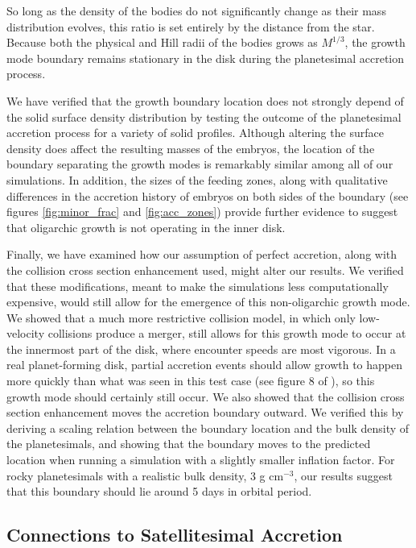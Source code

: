 So long as the density of the bodies do not significantly change as
their mass distribution evolves, this ratio is set entirely by the distance
from the star. Because both the physical and Hill radii of the bodies
grows as $M^{1/3}$, the growth mode boundary remains stationary
 in the disk during the planetesimal accretion process.
 
We have verified that the growth boundary location does not strongly depend of the
solid surface density distribution by testing the outcome of the planetesimal
accretion process for a variety of solid
profiles. Although altering the surface density does affect the
resulting masses of the embryos, the location of the boundary
separating the growth modes is remarkably similar among all of our simulations.
In addition, the sizes of the feeding zones, along with qualitative differences in the
accretion history of embryos on both sides of the boundary (see figures \ref{fig:minor_frac} and \ref{fig:acc_zones}) provide further evidence to
suggest that oligarchic growth is not operating in the inner disk.

Finally, we have examined how our assumption of perfect accretion, along with the collision cross section enhancement used, might alter our results. 
We verified that these modifications, meant to make the simulations less computationally expensive, would still allow for the emergence of this 
non-oligarchic growth mode.
We showed that a much more restrictive collision model, in which only low-velocity collisions produce a merger, still allows for 
this growth mode to occur at the innermost part of the disk, where encounter speeds are most vigorous. In a real planet-forming 
disk, partial accretion events should allow growth to happen more quickly than what was seen in this test case (see figure 8 of \cite{leinhardt15}), so this growth 
mode should certainly still occur. We also showed that the collision cross section enhancement moves the accretion boundary 
outward. We verified this by deriving a scaling relation between the boundary location and the bulk density of the planetesimals, 
and showing that the boundary moves to the predicted location when running a simulation with a slightly smaller inflation factor. 
For rocky planetesimals with a realistic bulk density, 3 g cm$^{-3}$, our results suggest that this boundary should lie around 5 days in orbital period.

\subsection{Connections to Satellitesimal Accretion}

